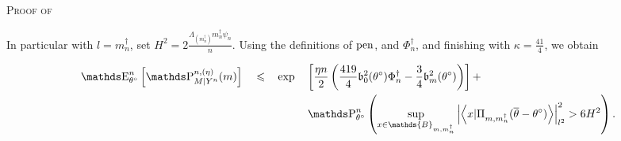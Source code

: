 \begin{pro}{\textsc{Proof of } \\}



In particular with $l = m^{\dagger}_{n}$, set $H^{2} = 2 \frac{\Lambda_{(m^{\dagger}_{n})}m^{\dagger}_{n}\psi_{n}}{n}$.
Using the definitions of $\operatorname{pen}$, and $\Phi^{\dagger}_{n}$, and finishing with $\kappa = \frac{41}{4}$, we obtain


\begin{alignat}{4}
& \E_{\theta^{\circ}}^{n}\left[\P_{M \vert Y^{n}}^{n, (\eta)}(m)\right]&& \leq && \exp && \left[\frac{\eta n}{2}\left(\frac{419}{4} \mathfrak{b}_{0}^{2}(\theta^{\circ}) \Phi^{\dagger}_{n} - \frac{3}{4} \mathfrak{b}_{m}^{2}(\theta^{\circ}) \right)\right] + \notag\\
& && && && \P_{\theta^{\circ}}^{n}\left(\sup\limits_{x \in \mathds{B}_{m, m^{\dagger}_{n}}} \left\vert \left\langle x \vert \Pi_{m, m^{\dagger}_{n}} (\overline{\theta} - \theta^{\circ}) \right\rangle \right\vert_{l^{2}}^{2} > 6H^{2}\right).
\end{alignat}




\end{pro}
